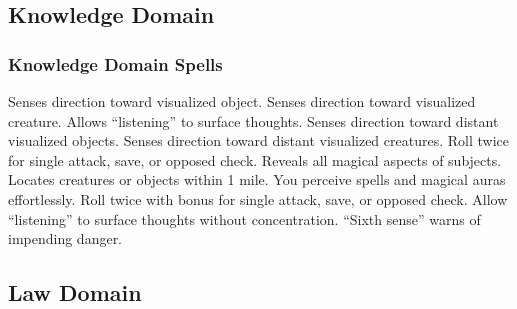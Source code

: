 \subsection{Knowledge Domain}
\subsubsection{Knowledge Domain Spells}
\begin{spelllist}
   Senses direction toward visualized object.
  \spellhead[1]{}
   Senses direction toward visualized creature.
  \spellhead[2]{}
   Allows ``listening'' to surface thoughts.
   Senses direction toward distant visualized objects.
   Senses direction toward distant visualized creatures.
   Roll twice for single attack, save, or opposed check.
    Reveals all magical aspects of subjects.
   Locates creatures or objects within 1 mile.
  You perceive spells and magical auras effortlessly.
   Roll twice with bonus for single attack, save, or opposed check.
   Allow ``listening'' to surface thoughts without concentration.
  \spellhead[8]{}
   ``Sixth sense'' warns of impending danger.
\end{spelllist}

\subsection{Law Domain}

